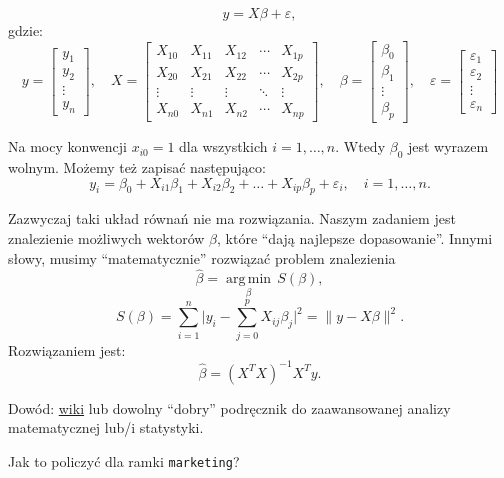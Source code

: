 \documentclass[]{article}
\newenvironment{Shaded}{\begin{snugshade}}{\end{snugshade}}
\newcommand{\KeywordTok}[1]{\textcolor[rgb]{0.13,0.29,0.53}{\textbf{#1}}}
\newcommand{\DecValTok}[1]{\textcolor[rgb]{0.00,0.00,0.81}{#1}}
\newcommand{\StringTok}[1]{\textcolor[rgb]{0.31,0.60,0.02}{#1}}
\newcommand{\OperatorTok}[1]{\textcolor[rgb]{0.81,0.36,0.00}{\textbf{#1}}}
\newcommand{\NormalTok}[1]{#1}
\begin{document}
\[ y = X\beta + \varepsilon,\] gdzie: \[y = \begin{bmatrix}
y_1 \\ y_2 \\ \vdots \\ y_n
\end{bmatrix}, \quad  {X}=\begin{bmatrix}
X_{10} & X_{11} & X_{12} & \cdots & X_{1p} \\
X_{20} & X_{21} & X_{22} & \cdots & X_{2p} \\
\vdots & \vdots & \vdots & \ddots & \vdots \\
X_{n0} &X_{n1} & X_{n2} & \cdots & X_{np}
\end{bmatrix} ,
\quad  \beta = \begin{bmatrix}
\beta_0 \\ \beta_1 \\ \vdots \\ \beta_p \end{bmatrix}, \quad \varepsilon = \begin{bmatrix}
\varepsilon_1 \\ \varepsilon_2 \\ \vdots \\ \varepsilon_n
\end{bmatrix}\]

Na mocy konwencji \(x_{i0} = 1\) dla wszystkich \(i = 1, \ldots, n\).
Wtedy \(\beta_0\) jest wyrazem wolnym. Możemy też zapisać następująco:
\[y_i = \beta_0 +X_{i1}\beta_1+X_{i2}\beta_2+\ldots+X_{ip}\beta_p+\varepsilon_i, \quad i=1,\ldots, n.\]

Zazwyczaj taki układ równań nie ma rozwiązania. Naszym zadaniem jest
znalezienie możliwych wektorów \(\beta\), które ``dają najlepsze
dopasowanie''. Innymi słowy, musimy ``matematycznie'' rozwiązać problem
znalezienia
\[\hat{\beta}=\underset{\beta}{\operatorname{arg\,min}}\,S(\beta), \]
\[S(\beta) = \sum_{i=1}^n \bigl| y_i - \sum_{j=0}^p X_{ij}\beta_j\bigr|^2 = \bigl\| y -  X  \beta \bigr\|^2.\]
Rozwiązaniem jest: \[\hat{\beta}= ( X^T X )^{-1}  X^T  y.\]

Dowód: \href{https://en.wikipedia.org/wiki/Ordinary_least_squares}{wiki}
lub dowolny ``dobry'' podręcznik do zaawansowanej analizy matematycznej
lub/i statystyki.

Jak to policzyć dla ramki \texttt{marketing}?

\begin{Shaded}
\end{Shaded}
\end{document}
